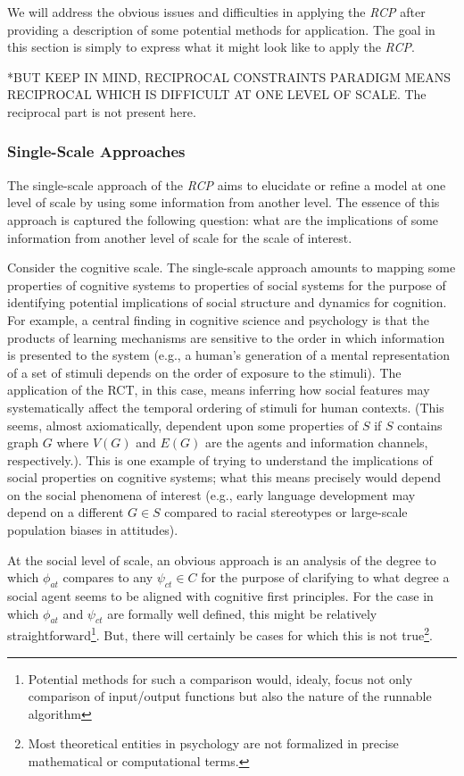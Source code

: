 \documentclass{article}
\begin{document}
We will address the obvious issues and difficulties in applying the \textit{RCP} after providing a description of some potential methods for application.  The goal in this section is simply to express what it might look like to apply the \textit{RCP}.  

*BUT KEEP IN MIND, RECIPROCAL CONSTRAINTS PARADIGM MEANS RECIPROCAL WHICH IS DIFFICULT AT ONE LEVEL OF SCALE.  The reciprocal part is not present here.

\subsubsection{Single-Scale Approaches}
The single-scale approach of the \textit{RCP} aims to elucidate or refine a model at one level of scale by using some information from another level.  The essence of this approach is captured the following question: what are the implications of some information from another level of scale for the scale of interest. 
 
Consider the cognitive scale. The single-scale approach amounts to mapping some properties of cognitive systems to properties of social systems for the purpose of identifying potential implications of social structure and dynamics for cognition.  For example, a central finding in cognitive science and psychology is that the products of learning mechanisms are sensitive to the order in which information is presented to the system (e.g., a human's generation of a mental representation of a set of stimuli depends on the order of exposure to the stimuli).  The application of the RCT, in this case, means inferring how social features may systematically affect the temporal ordering of stimuli for human contexts. (This seems, almost axiomatically, dependent upon some properties of $S$ if $S$ contains graph $G$ where $V(G)$ and $E(G)$ are the agents and information channels, respectively.).  This is one example of trying to understand the implications of social properties on cognitive systems; what this means precisely would depend on the social phenomena of interest (e.g., early language development may depend on a different $G \in S$ compared to racial stereotypes or large-scale population biases in attitudes).  

At the social level of scale, an obvious approach is an analysis of the degree to which $\phi_{at}$ compares to any $\psi_{ct} \in C$ for the purpose of clarifying to what degree a social agent seems to be aligned with cognitive first principles.  For the case in which $\phi_{at}$ and $\psi_{ct}$ are formally well defined, this might be relatively straightforward\footnote{Potential methods for such a comparison would, idealy, focus not only comparison of input/output functions but also the nature of the runnable algorithm}.  But, there will certainly be cases for which this is not true\footnote{Most theoretical entities in psychology are not formalized in precise mathematical or computational terms.}.  
\end{document}
